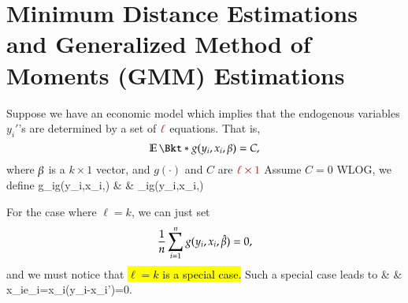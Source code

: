 \documentclass{Theme}
\begin{document}
\section{Minimum Distance Estimations and Generalized Method of Moments (GMM) Estimations}
Suppose we have an economic model which implies that the endogenous variables $y_i'$'s are 
determined by a set of $\hl{\ell}$ equations. That is,
\[
  \E{g(y_i,x_i,\be)}=C,
\]
where $\beta$ is a $k\times1$ vector, and $g(\cdot)$ and $C$ are $\hl{\ell\times1}$
Assume $C=0$ WLOG, we define 
\barc 
g_i\equiv g(y_i,x_i,\be) & \tand & _i\equiv g(y_i,x_i,\hat{\beta})
\earc 

For the case where $\ell=k$, we can just set 
\[
  \frac{1}{n}\sum_{i=1}^n g(y_i,x_i,\hat{\beta})=0, 
\]
and we must notice that \hl{${\ell=k}$ is a special case.} Such a special case leads to 
\barc 
{} & \tand &
\frn\sumn x_ie_i=\frn\sumn x_i(y_i-x_i'\be)=0.
\earc 
\end{document}
